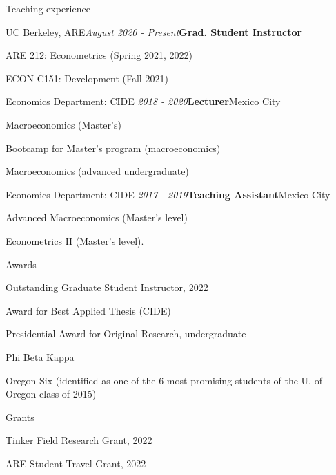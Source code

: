 \documentclass{resume} %
\begin{document}
\begin{rSection}{Teaching experience}

\begin{rSubsection}{UC Berkeley, ARE}{\textit{August 2020 - Present}}{\textbf{Grad. Student Instructor}}{}
\item ARE 212: Econometrics (Spring 2021, 2022)
\item ECON C151: Development (Fall 2021)
\end{rSubsection}

\begin{rSubsection}{Economics Department: CIDE}{\textit{ 2018 -  2020}}{\textbf{Lecturer}}{Mexico City}
\item Macroeconomics (Master's)
\item Bootcamp for Master's program (macroeconomics)
\item Macroeconomics (advanced undergraduate)
\end{rSubsection}

\begin{rSubsection}{Economics Department: CIDE}{\textit{ 2017 - 2019}}{\textbf{Teaching Assistant}}{Mexico City}
\item Advanced Macroeconomics (Master's level) 
\item Econometrics II (Master's level).
\end{rSubsection}

\end{rSection}


\begin{rSection}{Awards} \itemsep -2pt
\item Outstanding Graduate Student Instructor, 2022
\item Award for Best Applied Thesis (CIDE)
\item Presidential Award for Original Research, undergraduate
\item Phi Beta Kappa
\item Oregon Six (identified as one of the 6 most promising students of the U. of Oregon class of 2015)

\end{rSection}

\begin{rSection}{Grants} \itemsep -2pt
\item Tinker Field Research Grant, 2022
\item ARE Student Travel Grant, 2022

\end{rSection}
\end{document}
